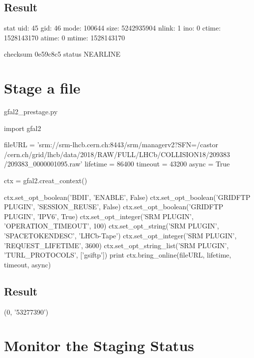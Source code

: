 \documentclass{lhcb+cta}
\begin{document}
\subsection*{Result}

\begin{python}
stat
uid: 45
gid: 46
mode: 100644
size: 5242935904
nlink: 1
ino: 0
ctime: 1528143170
atime: 0
mtime: 1528143170

checksum
0e59c8c5
status
NEARLINE 
\end{python}

\section*{Stage a file}

\begin{python}
gfal2_prestage.py

import gfal2

fileURL = 'srm://srm-lhcb.cern.ch:8443/srm/managerv2?SFN=/castor
/cern.ch/grid/lhcb/data/2018/RAW/FULL/LHCb/COLLISION18/209383
/209383_0000001095.raw'
lifetime = 86400
timeout = 43200
async = True

ctx = gfal2.creat_context()

ctx.set_opt_boolean('BDII', 'ENABLE', False)
ctx.set_opt_boolean('GRIDFTP PLUGIN', 'SESSION_REUSE', False)
ctx.set_opt_boolean('GRIDFTP PLUGIN', 'IPV6', True)
ctx.set_opt_integer('SRM PLUGIN', 'OPERATION_TIMEOUT', 100)
ctx.set_opt_string('SRM PLUGIN', 'SPACETOKENDESC', 'LHCb-Tape')
ctx.set_opt_integer('SRM PLUGIN', 'REQUEST_LIFETIME', 3600)
ctx.set_opt_string_list('SRM PLUGIN', 'TURL_PROTOCOLS', ['gsiftp'])
print ctx.bring_online(fileURL, lifetime, timeout, async)
\end{python}

\subsection*{Result}

\begin{python}
(0, '53277390')
\end{python}

\section*{Monitor the Staging Status}
\end{document}
